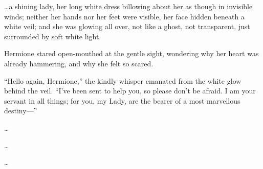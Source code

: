 \ldots{}a shining lady, her long white dress billowing about her as
though in invisible winds; neither her hands nor her feet were visible,
her face hidden beneath a white veil; and she was glowing all over, not
like a ghost, not transparent, just surrounded by soft white light.

Hermione stared open-mouthed at the gentle sight, wondering why her
heart was already hammering, and why she felt so scared.

``Hello again, Hermione,'' the kindly whisper emanated from the white
glow behind the veil. ``I've been sent to help you, so please don't be
afraid. I am your servant in all things; for you, my Lady, are the
bearer of a most marvellous destiny---''

\ldots{}

\ldots{}

\ldots{}
